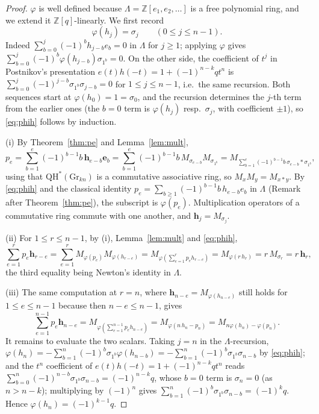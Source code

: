 \documentclass[11pt]{article}
\theoremstyle{plain}
\theoremstyle{definition}
\newcommand{\QH}{\mathrm{QH}^*}
\newcommand{\Gr}{\mathrm{Gr}}
\newcommand{\ZZ}{\mathbb{Z}}
\newcommand{\Lam}{\Lambda}
\newcommand{\bh}{\mathbf h}
\newcommand{\be}{\mathbf e}
\begin{document}
\begin{proof}
$\varphi$ is well defined because $\Lam=\ZZ[e_1,e_2,\dots]$ is a free polynomial
ring, and we extend it $\ZZ[q]$-linearly.  We first record
\begin{equation}\label{eq:phih}
\varphi(h_j)=\sigma_j\qquad(0\le j\le n-1).
\end{equation}
Indeed $\sum_{b=0}^{j}(-1)^bh_{j-b}e_b=0$ in $\Lam$ for $j\ge1$; applying
$\varphi$ gives $\sum_{b=0}^{j}(-1)^b\varphi(h_{j-b})\sigma_{1^b}=0$.  On the
other side, the coefficient of $t^j$ in Postnikov's presentation
$e(t)h(-t)=1+(-1)^{n-k}qt^n$ \cite[\texttt{eq:QH}, ll.500--507]{Pos} is
$\sum_{b=0}^{j}(-1)^{j-b}\sigma_{1^b}\sigma_{j-b}=0$ for $1\le j\le n-1$, i.e.\
the same recursion.  Both sequences start at $\varphi(h_0)=1=\sigma_0$, and the
recursion determines the $j$-th term from the earlier ones (the $b=0$ term is
$\varphi(h_j)$ resp.\ $\sigma_j$, with coefficient $\pm1$), so
\eqref{eq:phih} follows by induction.

(i)  By Theorem~\ref{thm:pe} and Lemma~\ref{lem:mult},
\[
p_e=\sum_{b=1}^{e}(-1)^{b-1}b\,\bh_{e-b}\be_b
=\sum_{b=1}^{e}(-1)^{b-1}b\,M_{\sigma_{e-b}}M_{\sigma_{1^b}}
=M_{\sum_{b=1}^{e}(-1)^{b-1}b\,\sigma_{e-b}*\sigma_{1^b}},
\]
using that $\QH(\Gr_{kn})$ is a commutative associative ring, so
$M_xM_y=M_{x*y}$.  By \eqref{eq:phih} and the classical identity
$p_e=\sum_{b\ge1}(-1)^{b-1}b\,h_{e-b}e_b$ in $\Lam$ (Remark after
Theorem~\ref{thm:pe}), the subscript is $\varphi(p_e)$.  Multiplication
operators of a commutative ring commute with one another, and $\bh_j=M_{\sigma_j}$.

(ii)  For $1\le r\le n-1$, by (i), Lemma~\ref{lem:mult} and \eqref{eq:phih},
\[
\sum_{e=1}^{r}p_e\bh_{r-e}
=\sum_{e=1}^{r}M_{\varphi(p_e)}M_{\varphi(h_{r-e})}
=M_{\varphi\left(\sum_{e=1}^{r}p_eh_{r-e}\right)}
=M_{\varphi(r\,h_r)}
=r\,M_{\sigma_r}=r\,\bh_r,
\]
the third equality being Newton's identity in $\Lam$.

(iii)  The same computation at $r=n$, where $\bh_{n-e}=M_{\varphi(h_{n-e})}$
still holds for $1\le e\le n-1$ because then $n-e\le n-1$, gives
\[
\sum_{e=1}^{n-1}p_e\bh_{n-e}
=M_{\varphi\left(\sum_{e=1}^{n-1}p_eh_{n-e}\right)}
=M_{\varphi(n\,h_n-p_n)}
=M_{n\varphi(h_n)-\varphi(p_n)} .
\]
It remains to evaluate the two scalars.  Taking $j=n$ in the $\Lam$-recursion,
$\varphi(h_n)=-\sum_{b=1}^{n}(-1)^b\sigma_{1^b}\varphi(h_{n-b})
=-\sum_{b=1}^{n}(-1)^b\sigma_{1^b}\sigma_{n-b}$ by \eqref{eq:phih}; and the
$t^n$ coefficient of $e(t)h(-t)=1+(-1)^{n-k}qt^n$ reads
$\sum_{b=0}^{n}(-1)^{n-b}\sigma_{1^b}\sigma_{n-b}=(-1)^{n-k}q$, whose $b=0$ term
is $\sigma_n=0$ (as $n>n-k$); multiplying by $(-1)^n$ gives
$\sum_{b=1}^{n}(-1)^{b}\sigma_{1^b}\sigma_{n-b}=(-1)^{k}q$.  Hence
$\varphi(h_n)=(-1)^{k-1}q$.


\end{proof}
\end{document}
